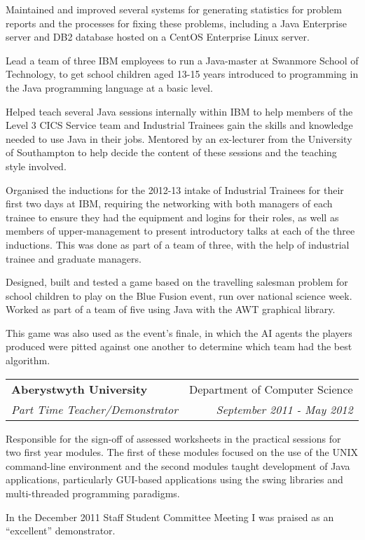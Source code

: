 \documentclass[letterpaper,11pt]{article}
\makeatletter
\newcommand{\ressubheading}[4]{
\vspace{10pt}
\begin{tabular*}{6.5in}{l@{\cftdotfill{\cftsecdotsep}\extracolsep{\fill}}r}
		\textbf{#1} & #2 \\
		\textit{#3} & \textit{#4} \\
\end{tabular*}\vspace{-6pt}
\vspace{10pt}}
\makeatother
\begin{document}
Maintained and improved several systems for generating statistics for problem 
reports and the processes for fixing these problems, including a Java 
Enterprise server and DB2 database hosted on a CentOS Enterprise Linux server.

Lead a team of three IBM employees to run a Java-master at Swanmore School of 
Technology, to get school children aged 13-15 years introduced to programming 
in the Java programming language at a basic level.

Helped teach several Java sessions internally within IBM to help members of the
Level 3 CICS Service team and Industrial Trainees gain the skills and knowledge
needed to use Java in their jobs. Mentored by an ex-lecturer from the 
University of Southampton to help decide the content of these sessions and the 
teaching style involved.

Organised the inductions for the 2012-13 intake of Industrial Trainees for 
their first two days at IBM, requiring the networking with both managers of 
each trainee to ensure they had the equipment and logins for their roles, as 
well as members of upper-management to present introductory talks at each of 
the three inductions. This was done as part of a team of three, with the help 
of industrial trainee and graduate managers.

Designed, built and tested a game based on the travelling salesman problem for
school children to play on the Blue Fusion event, run over national science 
week. Worked as part of a team of five using Java with the AWT graphical 
library.

This game was also used as the event's finale, in which the AI agents the 
players produced were pitted against one another to determine which team had the
best algorithm.


\ressubheading{Aberystwyth University}{Department of Computer Science}{Part 
Time Teacher/Demonstrator}{September 2011 - May 2012}

Responsible for the sign-off of assessed worksheets in the practical sessions 
for two first year modules. The first of these modules 
focused on the use of the UNIX command-line environment and the second
modules taught development of Java applications, particularly GUI-based 
applications using the swing libraries and multi-threaded programming 
paradigms.

In the December 2011 Staff Student Committee Meeting I was praised as an 
``excellent'' demonstrator.
\end{document}
